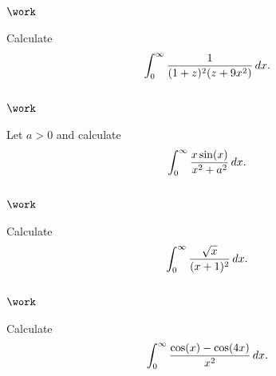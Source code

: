 \hypertarget{work-36}{%
\subsection{\texorpdfstring{\(\work\)}{\textbackslash work}}\label{work-36}}

\begin{problem}[?]

Calculate
\begin{align*}
\int_0^\infty {1 \over (1+z)^2 (z+9x^2)} \, dx
.\end{align*}

\end{problem}

\hypertarget{work-37}{%
\subsection{\texorpdfstring{\(\work\)}{\textbackslash work}}\label{work-37}}

\begin{problem}[?]

Let \(a>0\) and calculate
\begin{align*}
\int_0^\infty {x\sin(x) \over x^2 + a^2} \,dx
.\end{align*}

\end{problem}

\hypertarget{work-38}{%
\subsection{\texorpdfstring{\(\work\)}{\textbackslash work}}\label{work-38}}

\begin{problem}[?]

Calculate
\begin{align*}
\int_0^\infty {\sqrt x \over (x+1)^2} \,dx
.\end{align*}

\end{problem}

\hypertarget{work-39}{%
\subsection{\texorpdfstring{\(\work\)}{\textbackslash work}}\label{work-39}}

\begin{problem}[?]

Calculate
\begin{align*}
\int_0^\infty {\cos(x) - \cos(4x) \over x^2} \, dx
.\end{align*}

\end{problem}

